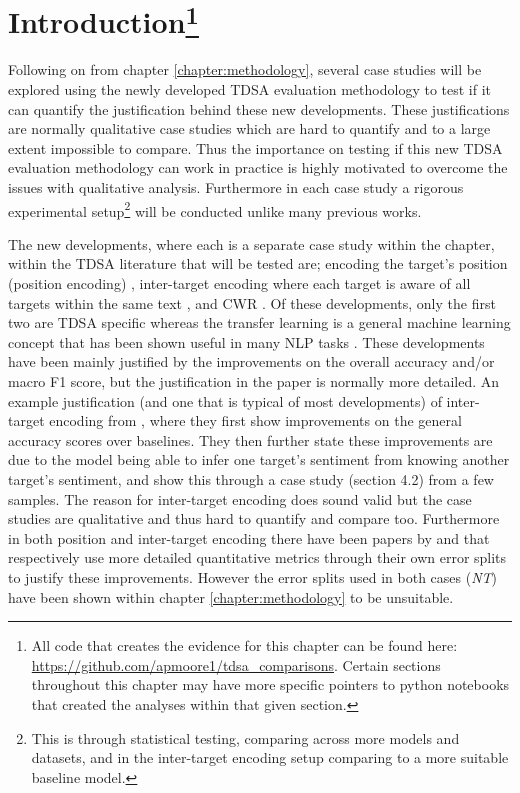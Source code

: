 \section[Introduction]{Introduction\footnote{All code that creates the evidence for this chapter can be found here: \url{https://github.com/apmoore1/tdsa_comparisons}. Certain sections throughout this chapter may have more specific pointers to python notebooks that created the analyses within that given section.}}
\label{section_case_intro}
Following on from chapter \ref{chapter:methodology}, several case studies will be explored using the newly developed TDSA evaluation methodology to test if it can quantify the justification behind these new developments. These justifications are normally qualitative case studies which are hard to quantify and to a large extent impossible to compare. Thus the importance on testing if this new TDSA evaluation methodology can work in practice is highly motivated to overcome the issues with qualitative analysis. Furthermore in each case study a rigorous experimental setup\footnote{This is through statistical testing, comparing across more models and datasets, and in the inter-target encoding setup comparing to a more suitable baseline model.} will be conducted unlike many previous works.

The new developments, where each is a separate case study within the chapter, within the TDSA literature that will be tested are; encoding the target's position (position encoding) \citep{gu-etal-2018-position}, inter-target encoding where each target is aware of all targets within the same text \citep{hazarika-etal-2018-modeling}, and CWR \citep{sun-etal-2019-utilizing,xu-etal-2019-bert}. Of these developments, only the first two are TDSA specific whereas the transfer learning is a general machine learning concept that has been shown useful in many NLP tasks \citep{peters-etal-2018-deep}. These developments have been mainly justified by the improvements on the overall accuracy and/or macro F1 score, but the justification in the paper is normally more detailed. An example justification (and one that is typical of most developments) of inter-target encoding from \citet{hazarika-etal-2018-modeling}, where they first show improvements on the general accuracy scores over baselines. They then further state these improvements are due to the model being able to infer one target's sentiment from knowing another target's sentiment, and show this through a case study (section 4.2) from a few samples. The reason for inter-target encoding does sound valid but the case studies are qualitative and thus hard to quantify and compare too. Furthermore in both position and inter-target encoding there have been papers by \citet{he-etal-2018-effective} and \citet{majumder-etal-2018-iarm} that respectively use more detailed quantitative metrics through their own error splits to justify these improvements. However the error splits used in both cases (\textit{NT}) have been shown within chapter \ref{chapter:methodology} to be unsuitable.

